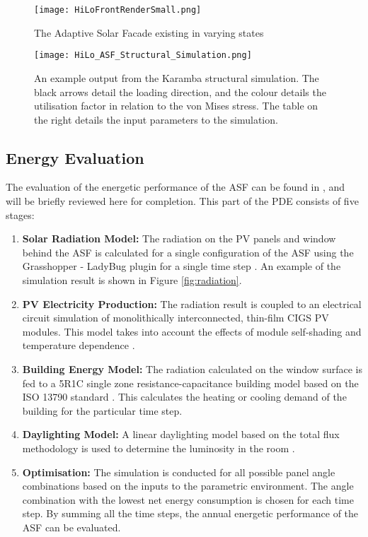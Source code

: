 \begin{figure}
\begin{center}
\texttt{[image: HiLoFrontRenderSmall.png]}
\caption{The Adaptive Solar Facade existing in varying states}
\label{fig:structure}
\end{center}
\end{figure}

\begin{figure}
\begin{center}
\texttt{[image: HiLo\_ASF\_Structural\_Simulation.png]}
\caption{An example output from the Karamba structural simulation. The black arrows detail the loading direction, and the colour details the utilisation factor in relation to the von Mises stress. The table on the right details the input parameters to the simulation.}
\label{fig:structureSettings}
\end{center}
\end{figure}

\subsection{Energy Evaluation}
\label{ch:energy}

The evaluation of the energetic performance of the ASF can be found in \cite{jayathissa2017optimising}, and will be briefly reviewed here for completion. This part of the PDE consists of five stages: 

\begin{enumerate}
\item \textbf{Solar Radiation Model:} The radiation on the PV panels and window behind the ASF is calculated for a single configuration of the ASF using the Grasshopper - LadyBug plugin for a single time step \cite{roudsari2013ladybug}. An example of the simulation result is shown in Figure \ref{fig:radiation}.
\item \textbf{PV Electricity Production:} The radiation result is coupled to an electrical circuit simulation of monolithically interconnected, thin-film CIGS PV modules. This model takes into account the effects of module self-shading and temperature dependence \cite{hofer2016parametric}. 
\item \textbf{Building Energy Model:} The radiation calculated on the window surface is fed to a 5R1C single zone resistance-capacitance building model based on the ISO 13790 standard \cite{de2008iso}. This calculates the heating or cooling demand of the building for the particular time step. 
\item \textbf{Daylighting Model:} A linear daylighting model based on the total flux methodology is used to determine the luminosity in the room \cite{szokolay1980handbook}. 
\item \textbf{Optimisation:} The simulation is conducted for all possible panel angle combinations based on the inputs to the parametric environment. The angle combination with the lowest net energy consumption is chosen for each time step. By summing all the time steps, the annual energetic performance of the ASF can be evaluated. 
\end{enumerate}

